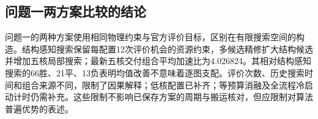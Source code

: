 \subsection{问题一两方案比较的结论}
问题一的两种方案使用相同物理约束与官方评价目标，区别在有限搜索空间的构造。结构感知搜索保留每配置12次评价机会的资源约束，多候选精修扩大结构候选并增加五核局部搜索；最新五核交付组合平均加速比为4.026824。其相对结构感知搜索的66胜、21平、13负表明均值改善不意味着逐图支配。评价次数、历史搜索时间和组合来源不同，限制了因果解释；低核配置已补齐；等预算消融及全流程冷启动计时仍需补充。这些限制不影响已保存方案的周期与搬运核对，但应限制对算法普遍优势的表述。
